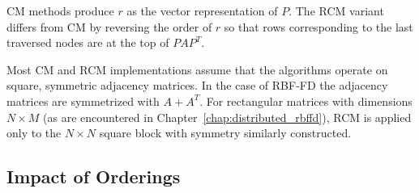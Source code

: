 \documentclass{report}
\begin{document}
CM methods produce $r$ as the vector representation of $P$. The RCM variant differs from CM by reversing the order of $r$ so that rows corresponding to the last traversed nodes are at the top of $PAP^T$. 

Most CM and RCM implementations assume that the algorithms operate on square, symmetric adjacency matrices. In the case of RBF-FD the adjacency matrices are symmetrized with $A+A^T$. For rectangular matrices with dimensions $N \times M$ (as are encountered in Chapter~\ref{chap:distributed_rbffd}), RCM is applied only to the $N\times N$ square block with symmetry similarly constructed. 


%




\subsection{Impact of Orderings}
\end{document}
